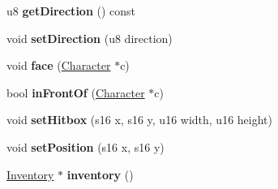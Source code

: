 \begin{DoxyCompactItemize}
\item 
\hypertarget{classCharacter_a4565df36ba45828e9a1e8e31ac3688c2}{u8 {\bfseries get\-Direction} () const }\label{classCharacter_a4565df36ba45828e9a1e8e31ac3688c2}

\item 
\hypertarget{classCharacter_a4754500de3c6d9715d7ff736bf1b5554}{void {\bfseries set\-Direction} (u8 direction)}\label{classCharacter_a4754500de3c6d9715d7ff736bf1b5554}

\item 
\hypertarget{classCharacter_a09cb3c5ec8456bb5be06da17672250ce}{void {\bfseries face} (\hyperlink{classCharacter}{Character} $\ast$c)}\label{classCharacter_a09cb3c5ec8456bb5be06da17672250ce}

\item 
\hypertarget{classCharacter_a6000ddb027701dc7d330320bca9c6d42}{bool {\bfseries in\-Front\-Of} (\hyperlink{classCharacter}{Character} $\ast$c)}\label{classCharacter_a6000ddb027701dc7d330320bca9c6d42}

\item 
\hypertarget{classCharacter_a742d70b1552770cac834a713082f5ca4}{void {\bfseries set\-Hitbox} (s16 x, s16 y, u16 width, u16 height)}\label{classCharacter_a742d70b1552770cac834a713082f5ca4}

\item 
\hypertarget{classCharacter_a199cb50dc9add8f5253389db2b8d2f80}{void {\bfseries set\-Position} (s16 x, s16 y)}\label{classCharacter_a199cb50dc9add8f5253389db2b8d2f80}

\item 
\hypertarget{classCharacter_a4fd78979a75d2be44e8d6537789a127f}{\hyperlink{classInventory}{Inventory} $\ast$ {\bfseries inventory} ()}\label{classCharacter_a4fd78979a75d2be44e8d6537789a127f}

\end{DoxyCompactItemize}
